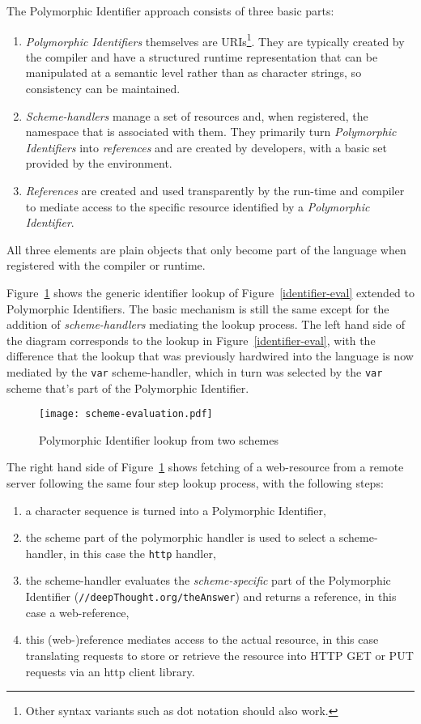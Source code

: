 \documentclass[preprint]{sigplanconf}
\begin{document}
The Polymorphic Identifier approach consists of three basic parts:
\begin{enumerate}
\item \emph{Polymorphic Identifiers} themselves are URIs\footnote{Other syntax variants such as dot notation should also work.}.
	  They are typically created by the 
	compiler and have a structured runtime representation that can be manipulated
	at a semantic level rather than as character strings, so consistency can be 
	maintained.
\item \emph{Scheme-handlers} manage a set of resources and, when registered,
	 the namespace that is associated
	with them.  They primarily turn \emph{Polymorphic Identifiers} into \emph{references} and
	are created by developers, with a basic set provided by the environment.
\item \emph{References} are created and used transparently by the run-time and compiler
	to mediate access to the specific resource identified by a \emph{Polymorphic Identifier}.
	
	
\end{enumerate}

All three elements are plain objects that only become part of the language when registered
with the compiler or runtime.

Figure~\ref{scheme-eval} shows the generic identifier lookup of Figure~\ref{identifier-eval}
extended to Polymorphic Identifiers.  The basic mechanism is still the same except for the
addition of \emph{scheme-handlers} mediating the lookup process.  The left hand side of the
diagram corresponds to the lookup in Figure~\ref{identifier-eval}, with the difference that
the lookup that was previously hardwired into the language is now mediated by the {\tt var}
scheme-handler, which in turn was selected by the {\tt var} scheme that's part of the 
Polymorphic Identifier.


\begin{figure}[htbp]
\centering\texttt{[image: scheme-evaluation.pdf]}
\caption{Polymorphic Identifier lookup from two schemes}
\label{scheme-eval}
\end{figure}


The right hand side of Figure~\ref{scheme-eval} shows fetching of a web-resource from
a remote server following the same four step lookup process, with the following steps:

\begin{enumerate}
\item a character sequence is turned into a Polymorphic Identifier,
\item the scheme part of the polymorphic handler is used to select a scheme-handler, in this case the {\tt http} handler,
\item the scheme-handler evaluates the \emph{scheme-specific} part of the Polymorphic Identifier ({\tt //deepThought.org/theAnswer})
	 and returns a reference, in this case a web-reference,
\item this (web-)reference mediates access to the actual resource, in this case translating requests to store or retrieve the 
	resource into HTTP GET or PUT requests via an http client library.
\end{enumerate}
\end{document}
